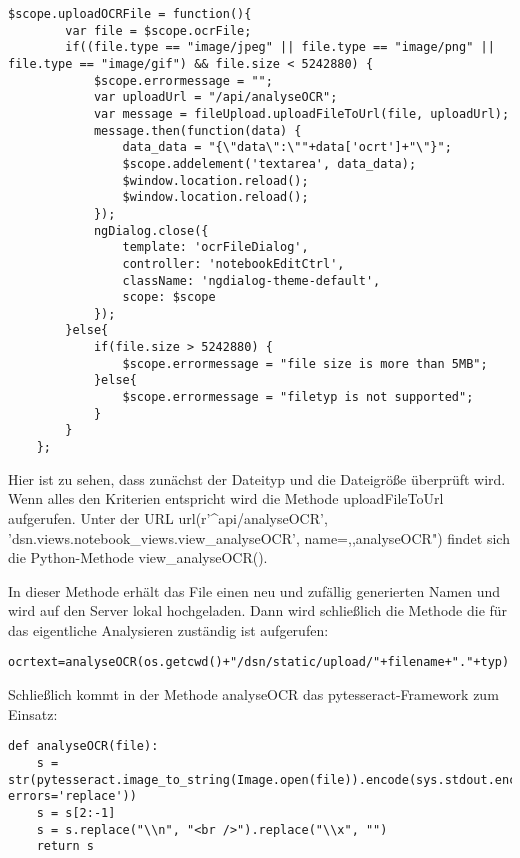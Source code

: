 \begin{lstlisting}[caption={Upload OCR-File}]
$scope.uploadOCRFile = function(){
        var file = $scope.ocrFile;
        if((file.type == "image/jpeg" || file.type == "image/png" || 				file.type == "image/gif") && file.size < 5242880) {
            $scope.errormessage = "";
            var uploadUrl = "/api/analyseOCR";
            var message = fileUpload.uploadFileToUrl(file, uploadUrl);
            message.then(function(data) {
                data_data = "{\"data\":\""+data['ocrt']+"\"}";
                $scope.addelement('textarea', data_data);
                $window.location.reload();
                $window.location.reload();
            });
            ngDialog.close({
                template: 'ocrFileDialog',
                controller: 'notebookEditCtrl',
                className: 'ngdialog-theme-default',
                scope: $scope
            });
        }else{
            if(file.size > 5242880) {
                $scope.errormessage = "file size is more than 5MB";
            }else{
                $scope.errormessage = "filetyp is not supported";
            }
        }
    };
\end{lstlisting}

Hier ist zu sehen, dass zunächst der Dateityp und die Dateigröße überprüft wird. Wenn alles den Kriterien entspricht wird die Methode uploadFileToUrl aufgerufen. Unter der URL url(r'\^{}api/analyseOCR', 'dsn.views.notebook\_views.view\_analyseOCR', name=,,analyseOCR") findet sich die Python-Methode view\_analyseOCR().

\newpage

In dieser Methode erhält das File einen neu und zufällig generierten Namen und wird auf den Server lokal hochgeladen. Dann wird schließlich die Methode die für das eigentliche Analysieren zuständig ist aufgerufen:

\begin{lstlisting}[caption={OCR-Analyse}]
ocrtext=analyseOCR(os.getcwd()+"/dsn/static/upload/"+filename+"."+typ)
\end{lstlisting}

Schließlich kommt in der Methode analyseOCR das pytesseract-Framework zum Einsatz:

\begin{lstlisting}[caption={analyseOCR mittels pytesseract}]
def analyseOCR(file):
	s = 						 str(pytesseract.image_to_string(Image.open(file)).encode(sys.stdout.encoding, 	errors='replace'))
    s = s[2:-1]
    s = s.replace("\\n", "<br />").replace("\\x", "")
    return s
\end{lstlisting}

